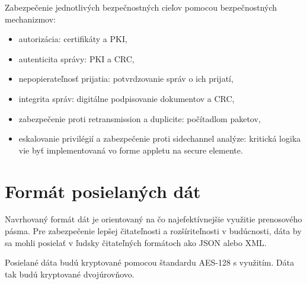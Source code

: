 \documentclass[12pt,a4paper,oneside,openright]{report}
\begin{document}
Zabezpečenie jednotlivých bezpečnostných cieľov pomocou bezpečnostných mechanizmov:
\singlespacing
\begin{itemize}
	\item autorizácia: certifikáty a PKI,
	\item autenticita správy: PKI a CRC,
	\item nepopierateľnosť prijatia: potvrdzovanie správ o ich prijatí,
	\item integrita správ: digitálne podpisovanie dokumentov a CRC,
	\item zabezpečenie proti retransmission a duplicite: počítadlom paketov,
	\item eskalovanie privilégií a zabezpečenie proti sidechannel analýze: kritická logika vie byť implementovaná vo forme appletu na secure elemente.
\end{itemize}
\onehalfspacing


\section{Formát posielaných dát}
Navrhovaný formát dát je orientovaný na čo najefektívnejšie využitie prenosového pásma. 
Pre zabezpečenie lepšej čitateľnosti a rozšíriteľnosti v budúcnosti, dáta by sa mohli posielať v ľudsky čitateľných formátoch ako JSON alebo XML.

Posielané dáta budú kryptované pomocou štandardu AES-128 s využitím. Dáta tak budú kryptované dvojúrovňovo.
\end{document}
